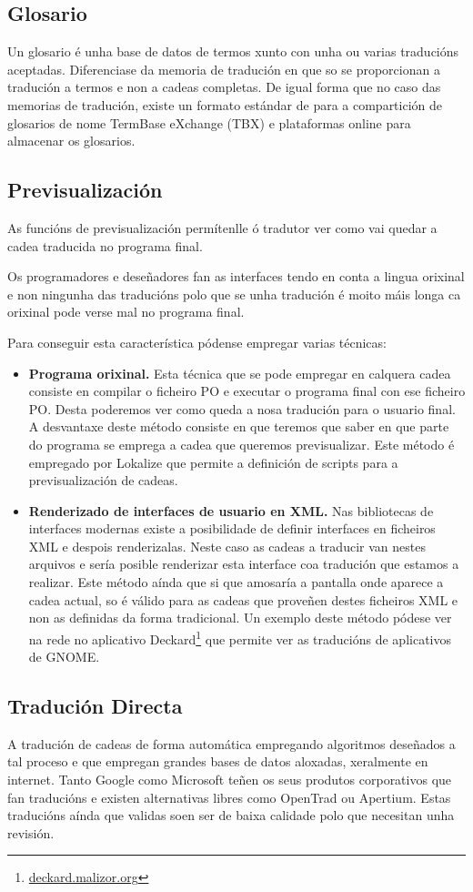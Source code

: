 \subsection{Glosario}
Un glosario é unha base de datos de termos xunto con unha ou varias traducións aceptadas. Diferenciase da memoria de tradución en que so se proporcionan a tradución a termos e non a cadeas completas. De igual forma que no caso das memorias de tradución, existe un formato estándar de para a compartición de glosarios de nome TermBase eXchange (TBX) e plataformas online para almacenar os glosarios.


\subsection{Previsualización}
As funcións de previsualización permítenlle ó tradutor ver como vai quedar a cadea traducida no programa final.

Os programadores e deseñadores fan as interfaces tendo en conta a lingua orixinal e non ningunha das traducións polo que se unha tradución é moito máis longa ca orixinal pode verse mal no programa final.

Para conseguir esta característica pódense empregar varias técnicas:

\begin{itemize}
  \item \textbf{Programa orixinal.} Esta técnica que se pode empregar en calquera cadea consiste en compilar o ficheiro PO e executar o programa final con ese ficheiro PO. Desta poderemos ver como queda a nosa tradución para o usuario final. A desvantaxe deste método consiste en que teremos que saber en que parte do programa se emprega a cadea que queremos previsualizar. Este método é empregado por Lokalize que permite a definición de scripts para a previsualización de cadeas.

  \item \textbf{Renderizado de interfaces de usuario en XML.} Nas bibliotecas de interfaces modernas existe a posibilidade de definir interfaces en ficheiros XML e despois renderizalas. Neste caso as cadeas a traducir van nestes arquivos e sería posible renderizar esta interface coa tradución que estamos a realizar. Este método aínda que si que amosaría a pantalla onde aparece a cadea actual, so é válido para as cadeas que proveñen destes ficheiros XML e non as definidas da forma tradicional. Un exemplo deste método pódese ver na rede no aplicativo Deckard\footnote{\href{http://deckard.malizor.org/}{deckard.malizor.org}} que permite ver as traducións de aplicativos de GNOME.
\end{itemize}


\subsection{Tradución Directa}
A tradución de cadeas de forma automática empregando algoritmos deseñados a tal proceso e que empregan grandes bases de datos aloxadas, xeralmente en internet. Tanto Google como Microsoft teñen os seus produtos corporativos que fan traducións e existen alternativas libres como OpenTrad ou Apertium. Estas traducións aínda que validas soen ser de baixa calidade polo que necesitan unha revisión.

